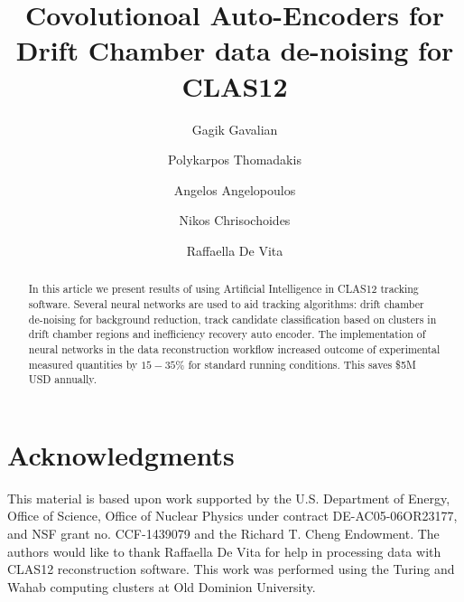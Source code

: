 \documentclass[preprint,12pt]{elsarticle}
\title{Covolutionoal Auto-Encoders for Drift Chamber data de-noising for CLAS12}
\author[1]{Gagik Gavalian}
\author[2]{Polykarpos Thomadakis}
\author[2]{Angelos Angelopoulos}
\author[2]{Nikos Chrisochoides}
\author[3]{Raffaella De Vita}
\begin{document}
\begin{abstract}

In this article we present results of using Artificial Intelligence in CLAS12 tracking software. Several neural networks are used to aid tracking algorithms: drift chamber de-noising for background reduction, track candidate classification based on clusters in drift chamber regions and inefficiency recovery auto encoder. The implementation of neural networks in the data reconstruction workflow increased outcome of experimental measured quantities by $15-35\%$ for standard running conditions. This saves \$5M USD annually.

\end{abstract}
\maketitle









%

\newpage

\section{Acknowledgments}

This material is based upon work supported by the U.S. Department of Energy, Office of Science,
Office of Nuclear Physics under contract DE-AC05-06OR23177, and NSF grant no. CCF-1439079 and
the Richard T. Cheng Endowment. The authors would like to thank Raffaella De Vita for help in
processing data with CLAS12 reconstruction software. This work was performed using the Turing
and Wahab computing clusters at Old Dominion University.
 
\newpage


\end{document}
